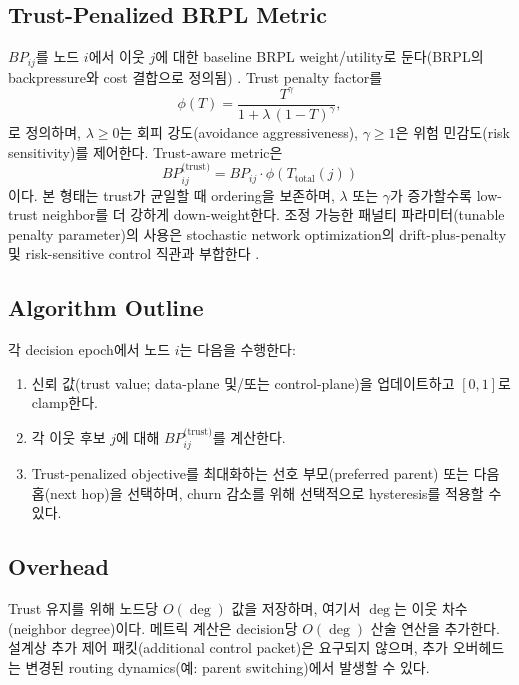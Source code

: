 \documentclass[11pt,a4paper]{article}
\begin{document}
\subsection{Trust-Penalized BRPL Metric}
\label{subsec:metric}
$BP_{ij}$를 노드 $i$에서 이웃 $j$에 대한 baseline BRPL weight/utility로 둔다(BRPL의 backpressure와 cost 결합으로 정의됨) \citep{moeller2016brpl}. Trust penalty factor를
\begin{equation}
\phi(T)=\frac{T^{\gamma}}{1+\lambda\,(1-T)^{\gamma}},
\label{eq:phi}
\end{equation}
로 정의하며, $\lambda\ge 0$는 회피 강도(avoidance aggressiveness), $\gamma\ge 1$은 위험 민감도(risk sensitivity)를 제어한다. Trust-aware metric은
\begin{equation}
BP^{\text{(trust)}}_{ij}=BP_{ij}\cdot \phi\!\left(T_{\text{total}}(j)\right)
\end{equation}
이다. 본 형태는 trust가 균일할 때 ordering을 보존하며, $\lambda$ 또는 $\gamma$가 증가할수록 low-trust neighbor를 더 강하게 down-weight한다. 조정 가능한 패널티 파라미터(tunable penalty parameter)의 사용은 stochastic network optimization의 drift-plus-penalty 및 risk-sensitive control 직관과 부합한다 \citep{neely2010}.

\subsection{Algorithm Outline}
\label{subsec:algo}
각 decision epoch에서 노드 $i$는 다음을 수행한다:
\begin{enumerate}[leftmargin=*]
  \item 신뢰 값(trust value; data-plane 및/또는 control-plane)을 업데이트하고 $[0,1]$로 clamp한다.
  \item 각 이웃 후보 $j$에 대해 $BP^{\text{(trust)}}_{ij}$를 계산한다.
  \item Trust-penalized objective를 최대화하는 선호 부모(preferred parent) 또는 다음 홉(next hop)을 선택하며, churn 감소를 위해 선택적으로 hysteresis를 적용할 수 있다.
\end{enumerate}

\subsection{Overhead}
\label{subsec:overhead}
Trust 유지를 위해 노드당 $O(\deg)$ 값을 저장하며, 여기서 $\deg$는 이웃 차수(neighbor degree)이다. 메트릭 계산은 decision당 $O(\deg)$ 산술 연산을 추가한다. 설계상 추가 제어 패킷(additional control packet)은 요구되지 않으며, 추가 오버헤드는 변경된 routing dynamics(예: parent switching)에서 발생할 수 있다.
\end{document}
